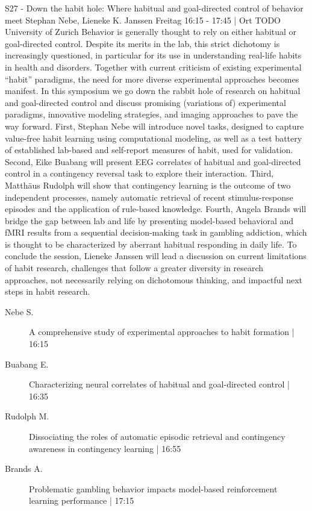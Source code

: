 
            \begin{symposium}
            {S27 - Down the habit hole: Where habitual and goal-directed control of behavior meet}
            {Stephan Nebe, Lieneke K. Janssen}
            {Freitag 16:15 - 17:45 | Ort TODO}
            { University of Zurich}
            Behavior is generally thought to rely on either habitual or goal-directed control. Despite its merits in the lab, this strict dichotomy is increasingly questioned, in particular for its use in understanding real-life habits in health and disorders. Together with current criticism of existing experimental “habit” paradigms, the need for more diverse experimental approaches becomes manifest. In this symposium we go down the rabbit hole of research on habitual and goal-directed control and discuss promising (variations of) experimental paradigms, innovative modeling strategies, and imaging approaches to pave the way forward. First, Stephan Nebe will introduce novel tasks, designed to capture value-free habit learning using computational modeling, as well as a test battery of established lab-based and self-report measures of habit, used for validation. Second, Eike Buabang will present EEG correlates of habitual and goal-directed control in a contingency reversal task to explore their interaction. Third, Matthäus Rudolph will show that contingency learning is the outcome of two independent processes, namely automatic retrieval of recent stimulus-response episodes and the application of rule-based knowledge. Fourth, Angela Brands will bridge the gap between lab and life by presenting model-based behavioral and fMRI results from a sequential decision-making task in gambling addiction, which is thought to be characterized by aberrant habitual responding in daily life. To conclude the session, Lieneke Janssen will lead a discussion on current limitations of habit research, challenges that follow a greater diversity in research approaches, not necessarily relying on dichotomous thinking, and impactful next steps in habit research.
            \begin{description}    
            
                \item [ Nebe S.] A comprehensive study of experimental approaches to habit formation \textcolor{mygray}{ | 16:15}    
                
                \item [ Buabang E.] Characterizing neural correlates of habitual and goal-directed control \textcolor{mygray}{ | 16:35}    
                
                \item [ Rudolph M.] Dissociating the roles of automatic episodic retrieval and contingency awareness in contingency learning \textcolor{mygray}{ | 16:55}    
                
                \item [ Brands A.] Problematic gambling behavior impacts model-based reinforcement learning performance \textcolor{mygray}{ | 17:15}    
                
            \end{description} 
            \end{symposium}
            